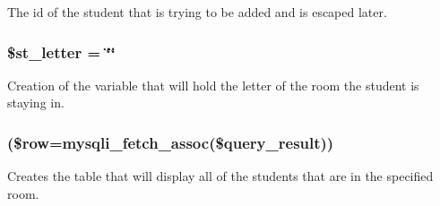 \-The id of the student that is trying to be added and is escaped later. \hypertarget{updateStudentTableDB_8php_aae4bfbe92cd3c7c9837886688f7440f5}{
\subsubsection[{\$st\-\_\-letter}]{\setlength{\rightskip}{0pt plus 5cm}\$st\-\_\-letter = \char`\"{}\char`\"{}}}\label{updateStudentTableDB_8php_aae4bfbe92cd3c7c9837886688f7440f5}
\-Creation of the variable that will hold the letter of the room the student is staying in. \hypertarget{updateStudentTableDB_8php_abbca5b4e0da1a7b7e95bb777ad93473d}{
\subsubsection[{while}]{(\$row=mysqli\-\_\-fetch\-\_\-assoc(\$query\-\_\-result))}}\label{updateStudentTableDB_8php_abbca5b4e0da1a7b7e95bb777ad93473d}
\-Creates the table that will display all of the students that are in the specified room. 